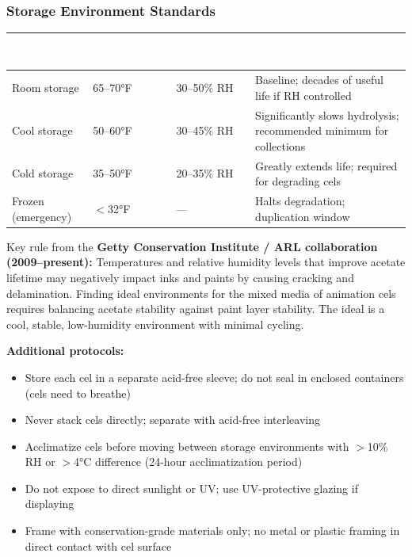 \documentclass[11pt,letterpaper]{article}
\newcommand{\tableheader}[1]{\textbf{\sffamily\textcolor{white}{#1}}}
\begin{document}
\subsubsection{Storage Environment Standards}

\begin{center}
\begin{tabularx}{\textwidth}{L{2.5cm}C{2cm}C{2cm}X}
\toprule
{}
\tableheader{Storage Tier} & \tableheader{Temperature} & \tableheader{Relative Humidity} & \tableheader{Expected Benefit} \\
\midrule
Room storage & 65--70°F & 30--50\% RH & Baseline; decades of useful life if RH controlled \\
Cool storage & 50--60°F & 30--45\% RH & Significantly slows hydrolysis; recommended minimum for collections \\
Cold storage & 35--50°F & 20--35\% RH & Greatly extends life; required for degrading cels \\
Frozen (emergency) & $<$32°F & --- & Halts degradation; duplication window \\
\bottomrule
\end{tabularx}
\end{center}

Key rule from the \textbf{Getty Conservation Institute / ARL collaboration (2009--present):} Temperatures and relative humidity levels that improve acetate lifetime may negatively impact inks and paints by causing cracking and delamination. Finding ideal environments for the mixed media of animation cels requires balancing acetate stability against paint layer stability. The ideal is a cool, stable, low-humidity environment with minimal cycling.

\textbf{Additional protocols:}
\begin{itemize}
  \item Store each cel in a separate acid-free sleeve; do not seal in enclosed containers (cels need to breathe)
  \item Never stack cels directly; separate with acid-free interleaving
  \item Acclimatize cels before moving between storage environments with $>$10\% RH or $>$4°C difference (24-hour acclimatization period)
  \item Do not expose to direct sunlight or UV; use UV-protective glazing if displaying
  \item Frame with conservation-grade materials only; no metal or plastic framing in direct contact with cel surface
\end{itemize}
\end{document}
